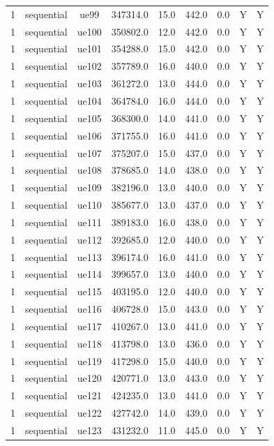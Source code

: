 \begin{table}[ht]
\begin{tabular}{|c|c|c|c|c|c|c|c|c|}
1 & sequential & ue99 & 347314.0 & 15.0 & 442.0 & 0.0 & Y & Y \\
1 & sequential & ue100 & 350802.0 & 12.0 & 442.0 & 0.0 & Y & Y \\
1 & sequential & ue101 & 354288.0 & 15.0 & 442.0 & 0.0 & Y & Y \\
1 & sequential & ue102 & 357789.0 & 16.0 & 440.0 & 0.0 & Y & Y \\
1 & sequential & ue103 & 361272.0 & 13.0 & 444.0 & 0.0 & Y & Y \\
1 & sequential & ue104 & 364784.0 & 16.0 & 444.0 & 0.0 & Y & Y \\
1 & sequential & ue105 & 368300.0 & 14.0 & 441.0 & 0.0 & Y & Y \\
1 & sequential & ue106 & 371755.0 & 16.0 & 441.0 & 0.0 & Y & Y \\
1 & sequential & ue107 & 375207.0 & 15.0 & 437.0 & 0.0 & Y & Y \\
1 & sequential & ue108 & 378685.0 & 14.0 & 438.0 & 0.0 & Y & Y \\
1 & sequential & ue109 & 382196.0 & 13.0 & 440.0 & 0.0 & Y & Y \\
1 & sequential & ue110 & 385677.0 & 13.0 & 437.0 & 0.0 & Y & Y \\
1 & sequential & ue111 & 389183.0 & 16.0 & 438.0 & 0.0 & Y & Y \\
1 & sequential & ue112 & 392685.0 & 12.0 & 440.0 & 0.0 & Y & Y \\
1 & sequential & ue113 & 396174.0 & 16.0 & 441.0 & 0.0 & Y & Y \\
1 & sequential & ue114 & 399657.0 & 13.0 & 440.0 & 0.0 & Y & Y \\
1 & sequential & ue115 & 403195.0 & 12.0 & 440.0 & 0.0 & Y & Y \\
1 & sequential & ue116 & 406728.0 & 15.0 & 443.0 & 0.0 & Y & Y \\
1 & sequential & ue117 & 410267.0 & 13.0 & 441.0 & 0.0 & Y & Y \\
1 & sequential & ue118 & 413798.0 & 13.0 & 436.0 & 0.0 & Y & Y \\
1 & sequential & ue119 & 417298.0 & 15.0 & 440.0 & 0.0 & Y & Y \\
1 & sequential & ue120 & 420771.0 & 13.0 & 443.0 & 0.0 & Y & Y \\
1 & sequential & ue121 & 424235.0 & 13.0 & 441.0 & 0.0 & Y & Y \\
1 & sequential & ue122 & 427742.0 & 14.0 & 439.0 & 0.0 & Y & Y \\
1 & sequential & ue123 & 431232.0 & 11.0 & 445.0 & 0.0 & Y & Y \\

\end{tabular}
\end{table}
